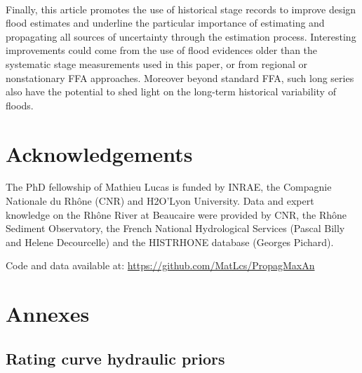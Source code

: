 \documentclass[11pt]{article}
\begin{document}
    \paragraph{}
    Finally, this article promotes the use of historical stage records to improve design flood estimates and underline the particular importance of estimating and propagating all sources of uncertainty through the estimation process. Interesting improvements could come from the use of flood evidences older than the systematic stage measurements used in this paper, or from regional or nonstationary FFA approaches. Moreover beyond standard FFA, such long series also have the potential to shed light on the long-term historical variability of floods. 

\section{Acknowledgements}

The PhD fellowship of Mathieu Lucas is funded by INRAE, the Compagnie Nationale du Rhône (CNR) and H2O’Lyon University. Data and expert knowledge on the Rhône River at Beaucaire were provided by CNR, the Rhône Sediment Observatory, the French National Hydrological Services (Pascal Billy and Helene Decourcelle) and the HISTRHONE database (Georges Pichard).

Code and data available at: \url{https://github.com/MatLcs/PropagMaxAn}

\newpage
\printbibliography
\newpage

\section{Annexes}

    \subsection{Rating curve hydraulic priors}
        
\end{document}
